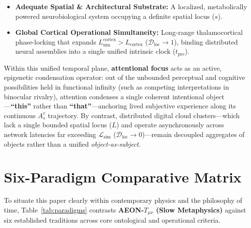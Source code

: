 \documentclass[11pt,a4paper]{article}
\begin{document}
\begin{itemize}
    \item \textbf{Adequate Spatial \& Architectural Substrate:} A localized, metabolically powered neurobiological system occupying a definite spatial locus ($s$).
    \item \textbf{Global Cortical Operational Simultaneity:} Long-range thalamocortical phase-locking that expands $L_{\mathrm{sim}}^{\mathrm{cortex}} > L_{\mathrm{cortex}}$ ($\mathcal{D}_{\mathrm{loc}} \to 1$), binding distributed neural assemblies into a single unified intrinsic clock ($t_{\mathrm{pre}}$).
\end{itemize}

Within this unified temporal plane, \textbf{attentional focus} acts as an active, epigenetic condensation operator: out of the unbounded perceptual and cognitive possibilities held in functional infinity (such as competing interpretations in binocular rivalry), attention condenses a single coherent intentional object---\textbf{``this''} rather than \textbf{``that''}---anchoring lived subjective experience along its continuous $A_s^v$ trajectory. By contrast, distributed digital cloud clusters---which lack a single bounded spatial locus ($L$) and operate asynchronously across network latencies far exceeding $\mathcal{L}_{\mathrm{sim}}$ ($\mathcal{D}_{\mathrm{loc}} \to 0$)---remain decoupled aggregates of objects rather than a unified \emph{object-as-subject}.

\section{Six-Paradigm Comparative Matrix}

To situate this paper clearly within contemporary physics and the philosophy of time, Table~\ref{tab:paradigms} contrasts \textbf{AEON-$T_{\mu\nu}$ (Slow Metaphysics)} against six established traditions across core ontological and operational criteria.
\end{document}
